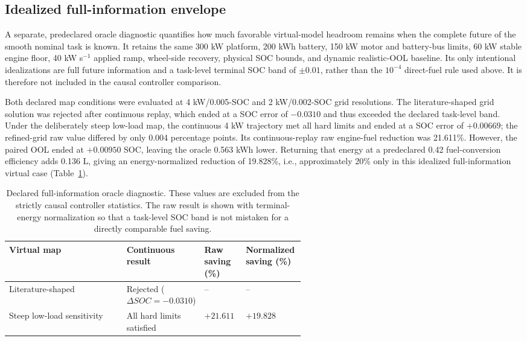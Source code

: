 \documentclass[energies,article,submit,moreauthors]{Definitions/mdpi}
\begin{document}
\subsection{Idealized full-information envelope}
A separate, predeclared oracle diagnostic quantifies how much favorable virtual-model headroom remains when the complete future of the smooth nominal task is known. It retains the same 300 kW platform, 200 kWh battery, 150 kW motor and battery-bus limits, 60 kW stable engine floor, 40 kW s$^{-1}$ applied ramp, wheel-side recovery, physical SOC bounds, and dynamic realistic-OOL baseline. Its only intentional idealizations are full future information and a task-level terminal SOC band of $\pm0.01$, rather than the $10^{-4}$ direct-fuel rule used above. It is therefore not included in the causal controller comparison.

Both declared map conditions were evaluated at 4 kW/0.005-SOC and 2 kW/0.002-SOC grid resolutions. The literature-shaped grid solution was rejected after continuous replay, which ended at a SOC error of $-0.0310$ and thus exceeded the declared task-level band. Under the deliberately steep low-load map, the continuous 4 kW trajectory met all hard limits and ended at a SOC error of $+0.00669$; the refined-grid raw value differed by only 0.004 percentage points. Its continuous-replay raw engine-fuel reduction was 21.611\%. However, the paired OOL ended at $+0.00950$ SOC, leaving the oracle 0.563 kWh lower. Returning that energy at a predeclared 0.42 fuel-conversion efficiency adds 0.136 L, giving an energy-normalized reduction of 19.828\%, i.e., approximately 20\% only in this idealized full-information virtual case (Table~\ref{tab:oracle}).

\begin{table}[H]
\centering
\caption{Declared full-information oracle diagnostic. These values are excluded from the strictly causal controller statistics. The raw result is shown with terminal-energy normalization so that a task-level SOC band is not mistaken for a directly comparable fuel saving.}
\label{tab:oracle}
\scriptsize
\setlength{\tabcolsep}{3pt}
\begin{tabularx}{\linewidth}{@{}X p{0.23\linewidth} p{0.14\linewidth} p{0.20\linewidth}@{}}
\toprule
Virtual map & Continuous result & Raw saving (\%) & Normalized saving (\%) \\
\midrule
Literature-shaped & Rejected ($\Delta SOC=-0.0310$) & -- & -- \\
Steep low-load sensitivity & All hard limits satisfied & $+21.611$ & $+19.828$ \\
\bottomrule
\end{tabularx}
\end{table}
\end{document}
